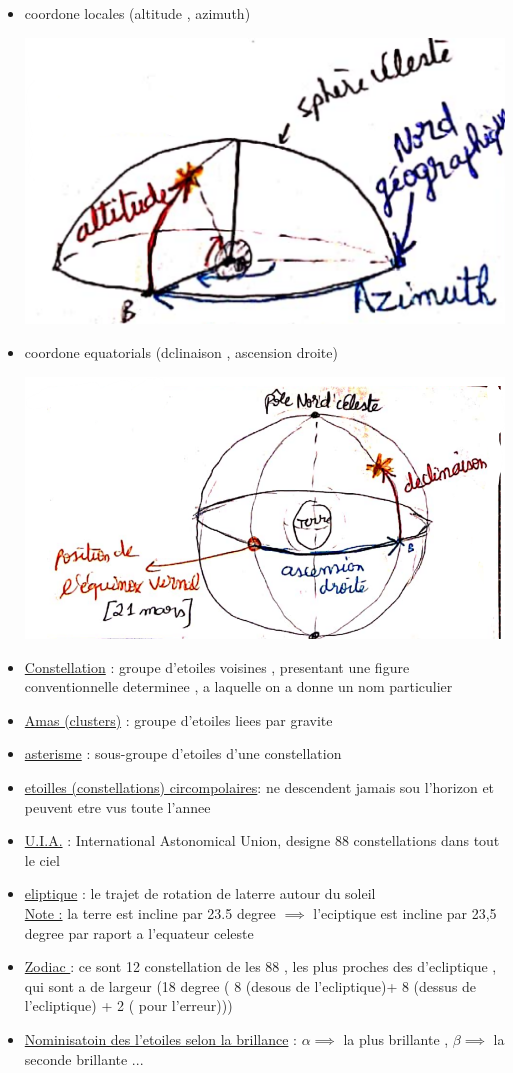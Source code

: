 \documentclass[12pt]{book}
\begin{document}
            \begin{itemize}
                \item coordone locales (altitude , azimuth)\\ 
                    \begin{center}
                        \includegraphics[width=0.3\linewidth]{pic/spherecelestcoordone1.png}
                    \end{center}
                    
                \item coordone equatorials (dclinaison , ascension droite)\\ 
                    \begin{center}
                        \includegraphics[width=0.3\linewidth]{pic/spherecelestcoordone2.png}
                    \end{center}
                    
            \end{itemize}
            \pagebreak
        \begin{itemize}
            \item \underline{Constellation} : groupe d'etoiles voisines , presentant une figure conventionnelle determinee , a laquelle on a donne un nom particulier 
            \item\underline{Amas (clusters)} : groupe d'etoiles liees par gravite 
            \item\underline{asterisme} : sous-groupe d'etoiles d'une constellation 
            \item\underline{etoilles (constellations) circompolaires}: ne descendent jamais sou l'horizon et peuvent etre vus toute l'annee 
            \item\underline{U.I.A.} : International Astonomical Union, designe 88 constellations dans tout le ciel
            \item\underline{eliptique} : le trajet de rotation de laterre autour du soleil \\ 
            \underline{Note :} la terre est incline par 23.5 degree $ \implies $ l'eciptique est incline par 23,5 degree par raport a l'equateur celeste 
            \item\underline{Zodiac } : ce sont 12 constellation de les 88 , les plus proches des d'ecliptique , qui sont a de largeur (18 degree ( 8 (desous de l'ecliptique)+ 8 (dessus de l'ecliptique) + 2 ( pour l'erreur)))
            \item\underline{Nominisatoin des l'etoiles selon la brillance} : $ \alpha \implies $ la plus brillante , $ \beta \implies  $ la seconde brillante ...
        \end{itemize}
\end{document}
